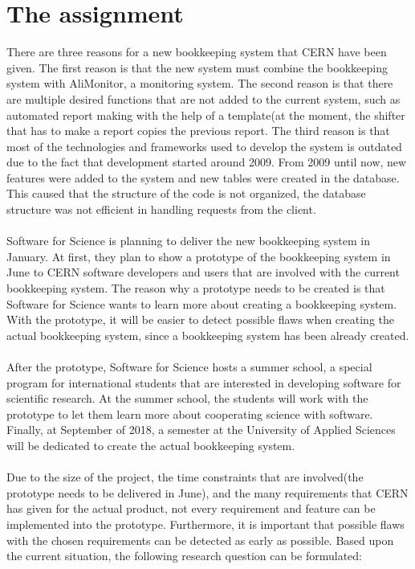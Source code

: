 \documentclass[paper=a4, fontsize=11pt,twoside]{scrartcl}	%
\begin{document}
\section{The assignment}
There are three reasons for a new bookkeeping system that CERN have been given. The first reason is that the new system must combine the bookkeeping system with AliMonitor, a monitoring system. The second reason is that there are multiple desired functions that are not added to the current system, such as automated report making with the help of a template(at the moment, the shifter that has to make a report copies the previous report. The third reason is that most of the technologies and frameworks used to develop the system is outdated due to the fact that development started around 2009. From 2009 until now, new features were added to the system and new tables were created in the database. This caused that the structure of the code is not organized, the database structure was not efficient in handling requests from the client. \\ \\
Software for Science is planning to deliver the new bookkeeping system in January. At first, they plan to show a prototype of the bookkeeping system in June to CERN software developers and users that are involved with the current bookkeeping system. The reason why a prototype needs to be created is that Software for Science wants to learn more about creating a bookkeeping system. With the prototype, it will be easier to detect possible flaws when creating the actual bookkeeping system, since a bookkeeping system has been already created. \\ \\
After the prototype, Software for Science hosts a summer school, a special program for international students that are interested in developing software for scientific research. At the summer school, the students will work with the prototype to let them learn more about cooperating science with software. Finally, at September of 2018, a semester at the University of Applied Sciences will be dedicated to create the actual bookkeeping system. \\ \\ 
Due to the size of the project, the time constraints that are involved(the prototype needs to be delivered in June), and the many requirements that CERN has given for the actual product, not every requirement and feature can be implemented into the prototype. Furthermore, it is important that possible flaws with the chosen requirements can be detected as early as possible. Based upon the current situation, the following research question can be formulated: \\ \\
\end{document}
